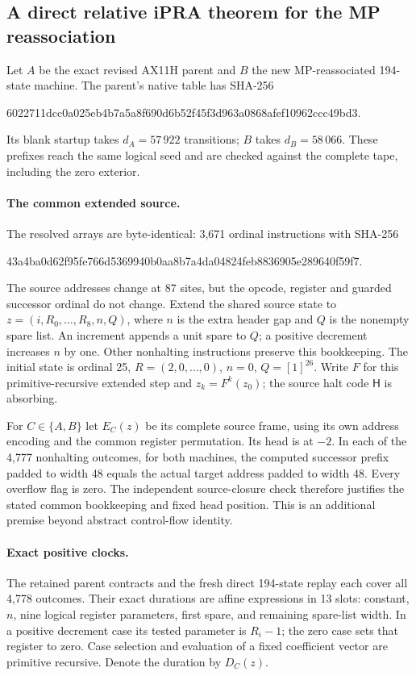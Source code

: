 \subsection{A direct relative iPRA theorem for the MP reassociation}

Let $A$ be the exact revised AX11H parent and $B$ the new MP-reassociated
194-state machine. The parent's native table has SHA-256
\begin{center}\small\ttfamily
6022711dcc0a025eb4b7a5a8f690d6b52f45f3d963a0868afef10962ccc49bd3.
\end{center}
Its blank startup takes $d_A=57\,922$ transitions; $B$ takes
$d_B=58\,066$. These prefixes reach the same logical seed and are checked
against the complete tape, including the zero exterior.

\paragraph{The common extended source.}
The resolved arrays are byte-identical: 3,671 ordinal instructions with
SHA-256
\begin{center}\small\ttfamily
43a4ba0d62f95fe766d5369940b0aa8b7a4da04824feb8836905e289640f59f7.
\end{center}
The source addresses change at 87 sites, but the opcode, register and
guarded successor ordinal do not change. Extend the shared source state to
$z=(i,R_0,\ldots,R_8,n,Q)$, where $n$ is the extra header gap and $Q$ is
the nonempty spare list. An increment appends a unit spare to $Q$; a
positive decrement increases $n$ by one. Other nonhalting instructions
preserve this bookkeeping. The initial state is ordinal 25,
$R=(2,0,\ldots,0)$, $n=0$, $Q=[1]^{26}$. Write $F$ for this
primitive-recursive extended step and $z_k=F^k(z_0)$; the source halt code
$\mathsf H$ is absorbing.

For $C\in\{A,B\}$ let $E_C(z)$ be its complete source frame, using its
own address encoding and the common register permutation. Its head is
at $-2$. In each of the 4,777 nonhalting outcomes, for both machines, the
computed successor prefix padded to width 48 equals the actual target
address padded to width 48. Every overflow flag is zero. The independent
source-closure check therefore justifies the stated common bookkeeping
and fixed head position. This is an additional premise beyond abstract
control-flow identity.

\paragraph{Exact positive clocks.}
The retained parent contracts and the fresh direct 194-state replay each
cover all 4,778 outcomes. Their exact durations are affine expressions in
13 slots: constant, $n$, nine logical register parameters, first spare,
and remaining spare-list width. In a positive decrement case its tested
parameter is $R_i-1$; the zero case sets that register to zero. Case
selection and evaluation of a fixed coefficient vector are primitive
recursive. Denote the duration by $D_C(z)$.

